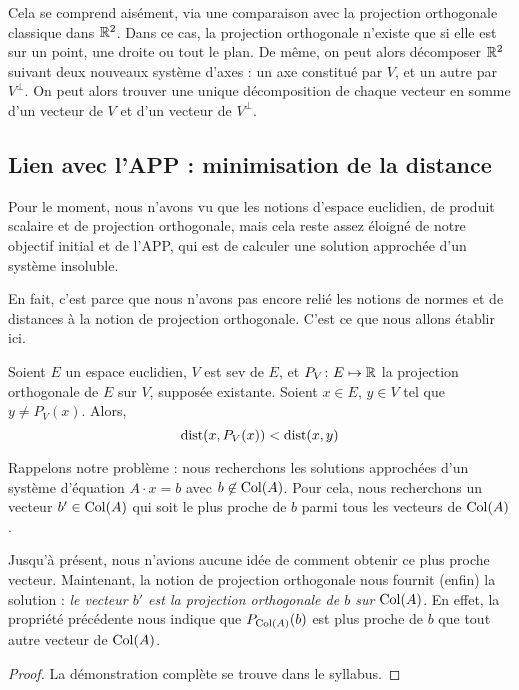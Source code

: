 Cela se comprend aisément, via une comparaison avec la projection orthogonale classique dans $\mathbb{R}^2$. Dans ce cas, la projection orthogonale n'existe que si elle est sur un point, une droite ou tout le plan. De même, on peut alors décomposer $\mathbb{R}^2$ suivant deux nouveaux \og système d'axes \fg{} : un axe constitué par $V$, et un autre par $V^\perp$. On peut alors trouver une unique décomposition de chaque vecteur en somme d'un vecteur de $V$ et d'un vecteur de $V^\perp$.

\subsection{Lien avec l'APP : minimisation de la distance}

Pour le moment, nous n'avons vu que les notions d'espace euclidien, de produit scalaire et de projection orthogonale, mais cela reste assez éloigné de notre objectif initial et de l'APP, qui est de calculer une solution approchée d'un système insoluble.

En fait, c'est parce que nous n'avons pas encore relié les notions de normes et de distances à la notion de projection orthogonale. C'est ce que nous allons établir ici.

\begin{propriete}
Soient $E$ un espace euclidien, $V$ est sev de $E$, et $P_V \colon E \mapsto \mathbb{R}$ la projection orthogonale de $E$ sur $V$, supposée existante. Soient $x \in E$, $y \in V$ tel que $y \neq P_V(x)$. Alors,
\[ \mathrm{dist}(x, P_V(x)) < \mathrm{dist}(x, y) \]
\end{propriete}

Rappelons notre problème : nous recherchons les solutions approchées d'un système d'équation $A\cdot x = b$ avec $b \not\in \mathrm{Col}(A)$. Pour cela, nous recherchons un vecteur $b' \in \mathrm{Col}(A)$ qui soit le plus proche de $b$ parmi tous les vecteurs de $\mathrm{Col}(A)$.

Jusqu'à présent, nous n'avions aucune idée de comment obtenir ce plus proche vecteur. Maintenant, la notion de projection orthogonale nous fournit (enfin) la solution : \emph{le vecteur $b'$ est la projection orthogonale de $b$ sur $\mathrm{Col}(A)$}. En effet, la propriété précédente nous indique que $P_{\mathrm{Col}(A)}(b)$ est plus proche de $b$ que tout autre vecteur de $\mathrm{Col}(A)$.

\begin{proof}
La démonstration complète se trouve dans le syllabus.
\end{proof}

